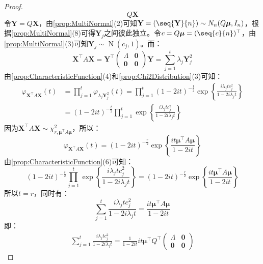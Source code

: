 \begin{proof}
\begin{equation*}
		Q\mathbf{X}
	\end{equation*}
	令$\mathbf{Y}=Q\mathbf{X}$，由\cref{prop:MultiNormal}(2)可知$\mathbf{Y}=(\seq{\mathbf{Y}}{n})\sim N_n(Q\boldsymbol{\mu},I_n)$，根据\cref{prop:MultiNormal}(8)可得$\mathbf{Y}_j$之间彼此独立。令$c=Q\boldsymbol{\mu}=(\seq{c}{n})^{\top}$，由\cref{prop:MultiNormal}(3)可知$\mathbf{Y}_j\sim \operatorname{N}(c_j,1)$。而：
	\begin{equation*}
		\mathbf{X}^{\top}A\mathbf{X}=\mathbf{Y}^{\top}
		\begin{pmatrix}
			\varLambda & \mathbf{0} \\
			\mathbf{0} & \mathbf{0}
		\end{pmatrix}\mathbf{Y}=\sum_{j=1}^{t}\lambda_j\mathbf{Y}_j^2
	\end{equation*}
	由\cref{prop:CharacteristicFunction}(4)和\cref{prop:Chi2Distribution}(3)可知：
	\begin{align*}
		\varphi_{\mathbf{X}^{\top}A\mathbf{X}}(t)
		&=\prod_{j=1}^{t}\varphi_{\lambda_j\mathbf{Y}_j^2}(t)=\prod_{j=1}^t(1-2it)^{-\frac{1}{2}}\exp\left\{\frac{i\lambda_jtc_j^2}{1-2i\lambda_jt}\right\} \\
		&=(1-2it)^{-\frac{t}{2}}\prod_{j=1}^t\exp\left\{\frac{i\lambda_jtc_j^2}{1-2i\lambda_jt}\right\}
	\end{align*}
	因为$\mathbf{X}^{\top}A\mathbf{X}\sim\chi_{r,\boldsymbol{\mu}^{\top}A\boldsymbol{\mu}}^2$，所以：
	\begin{equation*}
		\varphi_{\mathbf{X}^{\top}A\mathbf{X}}(t)=(1-2it)^{-\frac{r}{2}}\exp\left\{\frac{it\boldsymbol{\mu}^{\top}A\boldsymbol{\mu}}{1-2it}\right\}
	\end{equation*}
	由\cref{prop:CharacteristicFunction}(6)可知：
	\begin{equation*}
		(1-2it)^{-\frac{t}{2}}\prod_{j=1}^t\exp\left\{\frac{i\lambda_jtc_j^2}{1-2i\lambda_jt}\right\}=(1-2it)^{-\frac{r}{2}}\exp\left\{\frac{it\boldsymbol{\mu}^{\top}A\boldsymbol{\mu}}{1-2it}\right\}
	\end{equation*}
	所以$t=r$，同时有：
	\begin{equation*}
		\sum_{j=1}^{t}\frac{i\lambda_jtc_j^2}{1-2i\lambda_jt}=\frac{it\boldsymbol{\mu}^{\top}A\boldsymbol{\mu}}{1-2it}
	\end{equation*}
	即：
	\begin{gather*}
		\sum_{j=1}^{t}\frac{i\lambda_jtc_j^2}{1-2i\lambda_jt}=\frac{1}{1-2it}it\boldsymbol{\mu}^{\top}Q^{\top}
		\begin{pmatrix}
			\varLambda & \mathbf{0} \\
			\mathbf{0} & \mathbf{0}

\end{pmatrix}
\end{gather*}
\end{proof}
